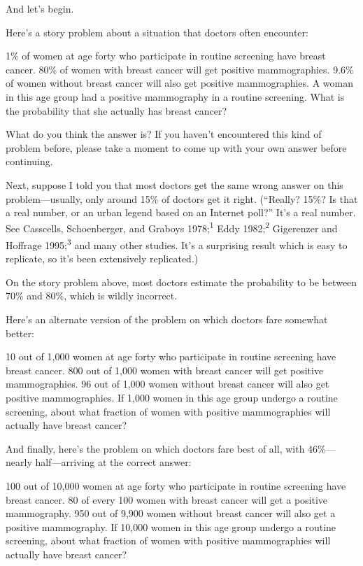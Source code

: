 {
 And let's begin.}

{
 Here's a story problem about a situation that
doctors often encounter:}

{
 1\% of women at age forty who participate in routine screening
have breast cancer. 80\% of women with breast cancer will get positive
mammographies. 9.6\% of women without breast cancer will also get
positive mammographies. A woman in this age group had a positive
mammography in a routine screening. What is the probability that she
actually has breast cancer?}

{
 What do you think the answer is? If you haven't
encountered this kind of problem before, please take a moment to come
up with your own answer before continuing.}

{
 Next, suppose I told you that most doctors get the same wrong
answer on this problem---usually, only around 15\% of doctors get it
right. (``Really? 15\%? Is that a real number, or an
urban legend based on an Internet poll?''
It's a real number. See Casscells, Schoenberger, and
Graboys 1978;\textsuperscript{1} Eddy 1982;\textsuperscript{2}
Gigerenzer and Hoffrage 1995;\textsuperscript{3} and many other
studies. It's a surprising result which is easy to
replicate, so it's been extensively replicated.)}

{
 On the story problem above, most doctors estimate the probability
to be between 70\% and 80\%, which is wildly incorrect.}

{
 Here's an alternate version of the problem on
which doctors fare somewhat better:}

{
 10 out of 1,000 women at age forty who participate in routine
screening have breast cancer. 800 out of 1,000 women with breast cancer
will get positive mammographies. 96 out of 1,000 women without breast
cancer will also get positive mammographies. If 1,000 women in this age
group undergo a routine screening, about what fraction of women with
positive mammographies will actually have breast cancer?}

{
 And finally, here's the problem on which doctors
fare best of all, with 46\%---nearly half---arriving at the correct
answer:}

{
 100 out of 10,000 women at age forty who participate in routine
screening have breast cancer. 80 of every 100 women with breast cancer
will get a positive mammography. 950 out of 9,900 women without breast
cancer will also get a positive mammography. If 10,000 women in this
age group undergo a routine screening, about what fraction of women
with positive mammographies will actually have breast cancer?}

